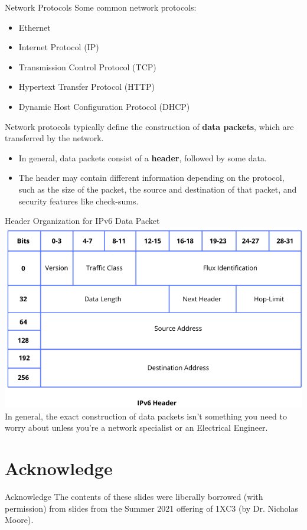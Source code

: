 \documentclass[11pt]{beamer}
\let\OldTexttt\texttt
\renewcommand{\texttt}[1]{\OldTexttt{\color{teal}{#1}}}
\begin{document}
\begin{frame}{Network Protocols}
Some common network protocols:
\begin{itemize}
\item Ethernet
\item Internet Protocol (IP)
\item Transmission Control Protocol (TCP)
\item Hypertext Transfer Protocol (HTTP)
\item Dynamic Host Configuration Protocol (DHCP)
\end{itemize}
Network protocols typically define the construction of  \textbf{data packets}, which are transferred by the network.
\begin{itemize}
\item In general, data packets consist of a \textbf{header}, followed by some data.  
\item The header may contain different information depending on the protocol, such as the size of the packet, the source and destination of that packet, and security features like check-sums.  
\end{itemize}
\end{frame}

\begin{frame}{Header Organization for IPv6 Data Packet}
\center
\includegraphics[scale=0.32]{IPV6-header.png} \\
In general, the exact construction of data packets isn't something you need to worry about unless you're a network specialist or an Electrical Engineer.  
\end{frame}


\section[Acknowledge]{Acknowledge}
\begin{frame}{Acknowledge}
\center
\vspace{8em}
The contents of these slides were liberally borrowed (with permission) from slides from the Summer 2021 offering of 1XC3 (by Dr. Nicholas Moore).  
\end{frame}
\end{document}
